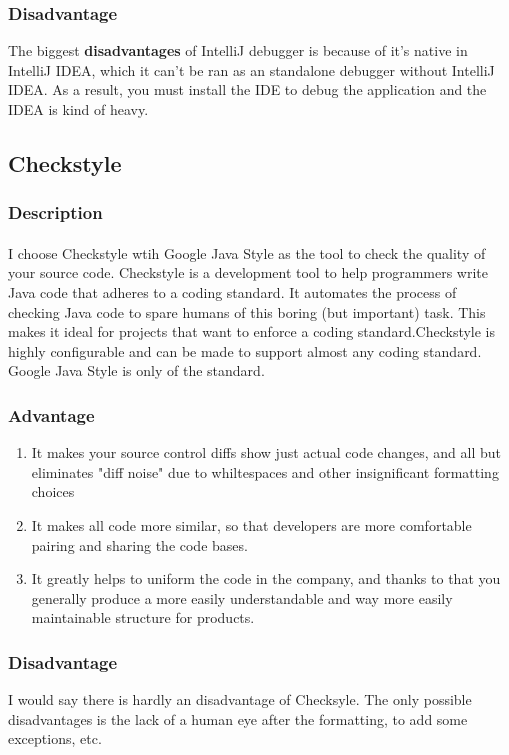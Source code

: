 \documentclass[10pt]{article}
\begin{document}
\subsubsection{Disadvantage}
The biggest \textbf{disadvantages} of IntelliJ debugger is because of it's native in IntelliJ IDEA, which it can't be ran as an standalone debugger without IntelliJ IDEA. As a result, you must install the IDE to debug the application and the IDEA is kind of heavy.


\pagebreak
\subsection{Checkstyle}

\subsubsection{Description}
\paragraph{}
I choose Checkstyle wtih Google Java Style as the tool to check the quality of your source code. Checkstyle is a development tool to help programmers write Java code that adheres to a coding standard. It automates the process of checking Java code to spare humans of this boring (but important) task. This makes it ideal for projects that want to enforce a coding standard.Checkstyle is highly configurable and can be made to support almost any coding standard. Google Java Style is only of the standard.

\subsubsection{Advantage}
\begin{enumerate}
    \item It makes your source control diffs show just actual code changes, and all but eliminates "diff noise" due to whiltespaces and other insignificant formatting choices
    \item It makes all code more similar, so that developers are more comfortable pairing and sharing the code bases.
    \item It greatly helps to uniform the code in the company, and thanks to that you generally produce a more easily understandable and way more easily maintainable structure for products.
\end{enumerate}

\subsubsection{Disadvantage}
I would say there is hardly an disadvantage of Checksyle. The only possible disadvantages is the lack of a human eye after the formatting, to add some exceptions, etc. 
\end{document}
